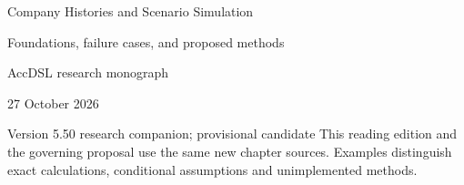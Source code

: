 \documentclass[11pt,a4paper]{report}
\begin{document}
\hypersetup{pageanchor=false}
\begin{titlepage}
{\Huge Company Histories and Scenario Simulation\par}
\vspace{12mm}
{\Large Foundations, failure cases, and proposed methods\par}
\vspace{8mm}
AccDSL research monograph\par 27 October 2026\par Version 5.50 research companion; provisional candidate
\vfill
This reading edition and the governing proposal use the same new chapter sources. Examples distinguish exact calculations, conditional assumptions and unimplemented methods.
\end{titlepage}
\hypersetup{pageanchor=true}
\tableofcontents
\clearpage{}


























\clearpage\label{sim:body-end}

\begingroup\raggedright
\endgroup
\end{document}
